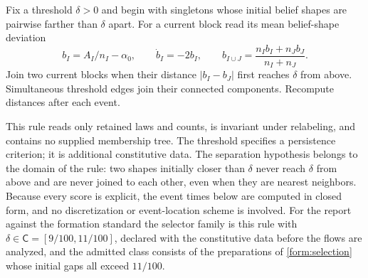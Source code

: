 Fix a threshold $\delta>0$ and begin with singletons whose initial belief shapes are pairwise farther than $\delta$ apart. For a current block read its mean belief-shape deviation
\begin{equation}
 b_I=A_I/n_I-\alpha_0,\qquad
 \dot b_I=-2b_I,\qquad
 b_{I\cup J}=\frac{n_Ib_I+n_Jb_J}{n_I+n_J}.
 \label{form:selector}
\end{equation}
Join two current blocks when their distance $|b_I-b_J|$ first reaches $\delta$ from
above. Simultaneous threshold edges join their connected components.
Recompute distances after each event.

This rule reads only retained laws and
counts, is invariant under relabeling, and contains no supplied membership
tree. The threshold specifies a persistence criterion; it is additional
constitutive data. The separation hypothesis belongs to the domain of the rule: two shapes initially closer than $\delta$ never reach $\delta$ from above and are never joined to each other, even when they are nearest neighbors. Because every score is explicit, the event times below are computed in closed form, and no discretization or event-location scheme is involved. For the report against the formation standard the selector family is this rule with $\delta\in\mathsf C=[9/100,11/100]$, declared with the constitutive data before the flows are analyzed, and the admitted class consists of the preparations of \cref{form:selection} whose initial gaps all exceed $11/100$.


